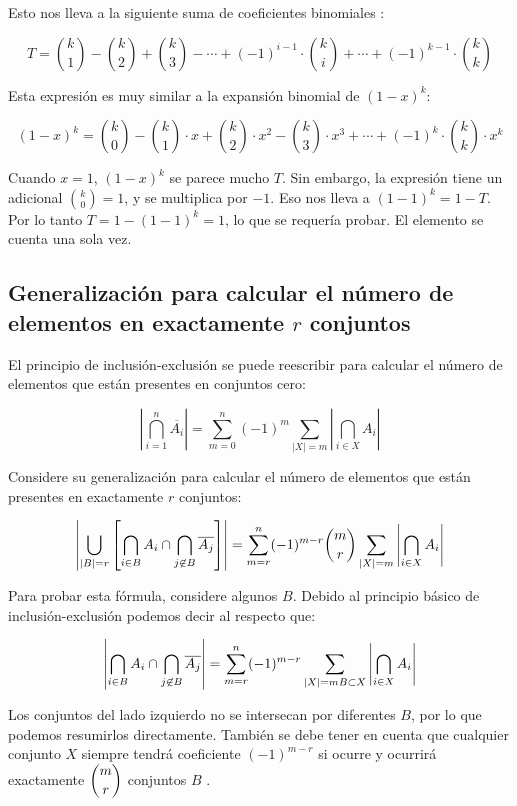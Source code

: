 Esto nos lleva a la siguiente suma de coeficientes binomiales :

$$T = \binom{k}{1} - \binom{k}{2} + \binom{k}{3} - \cdots + (-1)^{i-1}\cdot \binom{k}{i} + \cdots + (-1)^{k-1}\cdot \binom{k}{k}$$

Esta expresión es muy similar a la expansión binomial de $(1 - x)^k$:

$$(1 - x)^k = \binom{k}{0} - \binom{k}{1} \cdot x + \binom{k}{2} \cdot x^2 - \binom{k}{3} \cdot x^3 + \cdots + (-1)^k\cdot \binom{k}{k} \cdot x^k$$

Cuando $x = 1$, $(1 - x)^k$ se parece mucho $T$. Sin embargo, la expresión tiene un adicional  $\binom{k}{0} = 1$, y se multiplica por $-1$. Eso nos lleva a $(1 - 1)^k = 1 - T$. Por lo tanto
$T = 1 - (1 - 1)^k = 1$, lo que se requería probar. El elemento se cuenta una sola vez.

\subsection{Generalización para calcular el número de elementos en exactamente $r$ conjuntos}

El principio de inclusión-exclusión se puede reescribir para calcular el número de elementos que están presentes en conjuntos cero:

$$\left|\bigcap_{i=1}^n \overline{A_i}\right|=\sum_{m=0}^n (-1)^m \sum_{|X|=m} \left|\bigcap_{i\in X} A_{i}\right|$$

Considere su generalización para calcular el número de elementos que están presentes en exactamente $r$ conjuntos:

$$\left|\bigcup_{|B|=r}\left[\bigcap_{i \in B} A_i \cap \bigcap_{j \not\in B} \overline{A_j}\right]\right|=\sum_{m=r}^n (-1)^{m-r}\dbinom{m}{r} \sum_{|X|=m} \left|\bigcap_{i \in X} A_{i}\right|$$

Para probar esta fórmula, considere algunos $B$. Debido al principio básico de inclusión-exclusión podemos decir al respecto que:

$$\left|\bigcap_{i \in B} A_i \cap \bigcap_{j \not \in B} \overline{A_j}\right|=\sum_{m=r}^{n} (-1)^{m-r} \sum_{\substack{|X|=m \newline B \subset X}}\left|\bigcap_{i\in X} A_{i}\right|$$

Los conjuntos del lado izquierdo no se intersecan por diferentes $B$, por lo que podemos resumirlos directamente. También se debe tener en cuenta que cualquier conjunto $X$ siempre tendrá coeficiente $(-1)^{m-r}$ si ocurre y ocurrirá exactamente $\dbinom{m}{r}$ conjuntos $B$ .